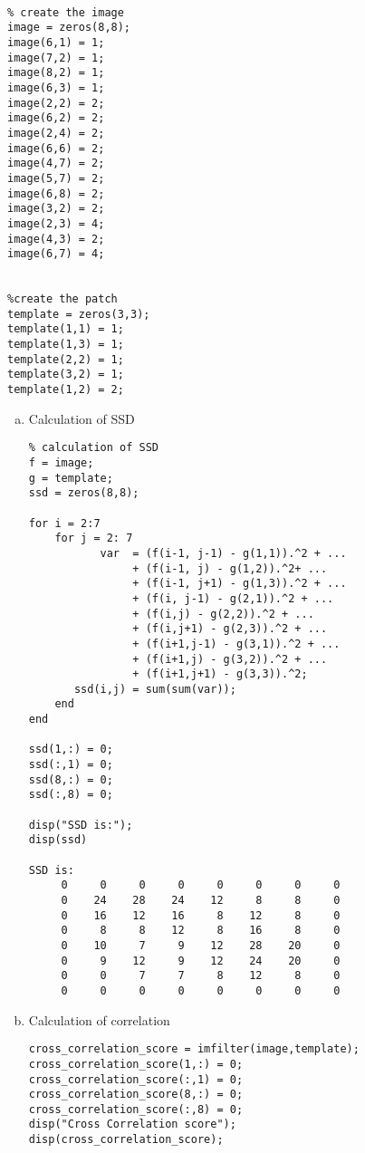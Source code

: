 \documentclass{article}
\begin{document}
\begin{verbatim}

% create the image
image = zeros(8,8);
image(6,1) = 1;
image(7,2) = 1;
image(8,2) = 1;
image(6,3) = 1;
image(2,2) = 2;
image(6,2) = 2;
image(2,4) = 2;
image(6,6) = 2;
image(4,7) = 2;
image(5,7) = 2;
image(6,8) = 2;
image(3,2) = 2;
image(2,3) = 4;
image(4,3) = 2;
image(6,7) = 4;


%create the patch
template = zeros(3,3);
template(1,1) = 1;
template(1,3) = 1;
template(2,2) = 1;
template(3,2) = 1;
template(1,2) = 2;

\end{verbatim}  

\begin{enumerate}[(a)]  
\item  Calculation of SSD \\
  \begin{verbatim}
% calculation of SSD
f = image;
g = template;
ssd = zeros(8,8);

for i = 2:7
    for j = 2: 7
           var  = (f(i-1, j-1) - g(1,1)).^2 + ...
                + (f(i-1, j) - g(1,2)).^2+ ...
                + (f(i-1, j+1) - g(1,3)).^2 + ...
                + (f(i, j-1) - g(2,1)).^2 + ...
                + (f(i,j) - g(2,2)).^2 + ...
                + (f(i,j+1) - g(2,3)).^2 + ...
                + (f(i+1,j-1) - g(3,1)).^2 + ...
                + (f(i+1,j) - g(3,2)).^2 + ...
                + (f(i+1,j+1) - g(3,3)).^2;
       ssd(i,j) = sum(sum(var));
    end
end

ssd(1,:) = 0;
ssd(:,1) = 0;
ssd(8,:) = 0;
ssd(:,8) = 0;

disp("SSD is:");
disp(ssd)

SSD is:
     0     0     0     0     0     0     0     0
     0    24    28    24    12     8     8     0
     0    16    12    16     8    12     8     0
     0     8     8    12     8    16     8     0
     0    10     7     9    12    28    20     0
     0     9    12     9    12    24    20     0
     0     0     7     7     8    12     8     0
     0     0     0     0     0     0     0     0
  \end{verbatim}

\item Calculation of correlation

  \begin{verbatim}
cross_correlation_score = imfilter(image,template);
cross_correlation_score(1,:) = 0;
cross_correlation_score(:,1) = 0;
cross_correlation_score(8,:) = 0;
cross_correlation_score(:,8) = 0;
disp("Cross Correlation score");
disp(cross_correlation_score);


\end{verbatim}
\end{enumerate}
\end{document}
